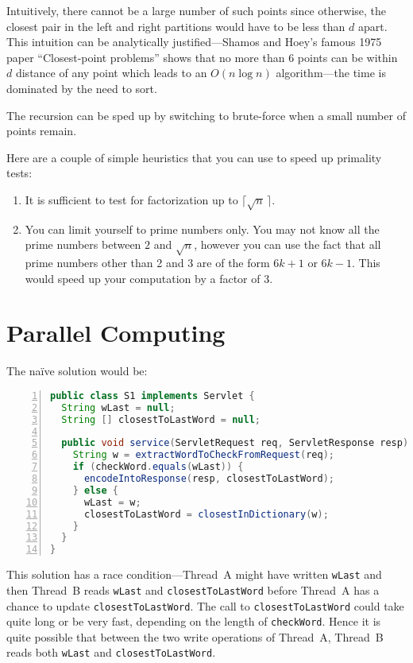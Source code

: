 Intuitively, there cannot be a large 
number of such points since otherwise, the closest pair
in the left and right partitions would have to be less than $d$ apart. This intuition
can be analytically justified---Shamos and Hoey's famous
1975 paper ``Closest-point problems'' shows that no more than 6 points
can be within $d$ distance of any point which leads to an $O(n \log n)$ algorithm---the time 
is dominated by the need to sort.

The recursion can be sped up by switching to brute-force when
a small number of points remain.

 Here are a couple of simple heuristics that you can use to
speed up primality tests:
\begin{enumerate}
\item It is sufficient to test for factorization up to $\lceil \sqrt n \, \rceil$.
\item You can limit yourself to prime numbers only. You may not know
  all the prime numbers between $2$ and $\sqrt n$, however you can use
  the fact that all prime numbers other than 2 and 3 are of the
  form $6k +1$ or $6k -1$. This would speed up your computation by a
  factor of $3$.
\end{enumerate}

 
\chapter{ Parallel Computing}

The na\"{i}ve solution would be: 
\begin{lstlisting}[basicstyle=\footnotesize,numbers=left,breaklines=true,language=Java]
public class S1 implements Servlet {
  String wLast = null;
  String [] closestToLastWord = null;

  public void service(ServletRequest req, ServletResponse resp) {
    String w = extractWordToCheckFromRequest(req);
    if (checkWord.equals(wLast)) {
      encodeIntoResponse(resp, closestToLastWord);
    } else {
      wLast = w;
      closestToLastWord = closestInDictionary(w);
    }
  }
}
\end{lstlisting}

This solution has a race condition---Thread~A might have 
written \texttt{wLast} and then Thread~B reads \texttt{wLast} and \texttt{closestToLastWord} 
before Thread~A has a chance to update \texttt{closestToLastWord}. 
The call to \texttt{closestToLastWord} could take quite long or be very fast, depending 
on the length of \texttt{checkWord}.  Hence it is quite possible that
between the two write operations of Thread~A, Thread~B reads both \texttt{wLast} and \texttt{closestToLastWord}.

